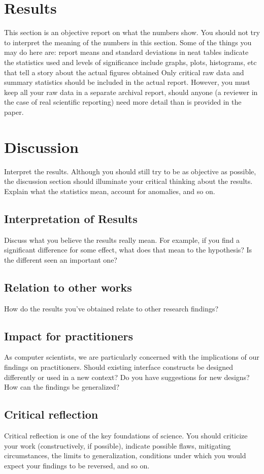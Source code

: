 \section{Results}

This section is an objective report on what the numbers show. You should not try to interpret the meaning of the numbers in this section. Some of the things you may do here are: 
report means and standard deviations in neat tables 
indicate the statistics used and levels of significance 
include graphs, plots, histograms, etc that tell a story about the actual figures obtained 
Only critical raw data and summary statistics should be included in the actual report. However, you must keep all your raw data in a separate archival report, should anyone (a reviewer in the case of real scientific reporting) need more detail than is provided in the paper. 
\section{Discussion}
Interpret the results. Although you should still try to be as objective as possible, the discussion section should illuminate your critical thinking about the results. Explain what the statistics mean, account for anomalies, and so on.
\subsection{Interpretation of Results}
Discuss what you believe the results really mean. For example, if you find a significant difference for some effect, what does that mean to the hypothesis? Is the different seen an important one?
\subsection{Relation to other works}
How do the results you’ve obtained relate to other research findings?
\subsection{Impact for practitioners}
As computer scientists, we are particularly concerned with the implications of our findings on practitioners. Should existing interface constructs be designed differently or used in a new context? Do you have suggestions for new designs? How can the findings be generalized?
\subsection{Critical reflection}
Critical reflection is one of the key foundations of science. You should criticize your work (constructively, if possible), indicate possible flaws, mitigating circumstances, the limits to generalization, conditions under which you would expect your findings to be reversed, and so on.
